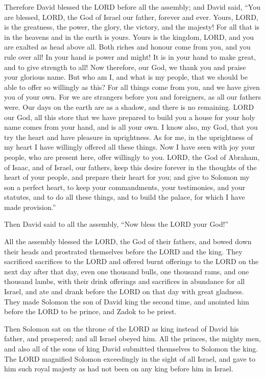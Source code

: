  Therefore David blessed the LORD before all the assembly;
and David said, ``You are blessed, LORD, the God of Israel our father,
forever and ever.  Yours, LORD, is the greatness, the
power, the glory, the victory, and the majesty! For all that is in the
heavens and in the earth is yours. Yours is the kingdom, LORD, and you
are exalted as head above all.  Both riches and honour come
from you, and you rule over all! In your hand is power and might! It is
in your hand to make great, and to give strength to all! 
Now therefore, our God, we thank you and praise your glorious name.
 But who am I, and what is my people, that we should be
able to offer so willingly as this? For all things come from you, and we
have given you of your own.  For we are strangers before
you and foreigners, as all our fathers were. Our days on the earth are
as a shadow, and there is no remaining.  LORD our God, all
this store that we have prepared to build you a house for your holy name
comes from your hand, and is all your own.  I know also, my
God, that you try the heart and have pleasure in uprightness. As for me,
in the uprightness of my heart I have willingly offered all these
things. Now I have seen with joy your people, who are present here,
offer willingly to you.  LORD, the God of Abraham, of
Isaac, and of Israel, our fathers, keep this desire forever in the
thoughts of the heart of your people, and prepare their heart for you;
 and give to Solomon my son a perfect heart, to keep your
commandments, your testimonies, and your statutes, and to do all these
things, and to build the palace, for which I have made provision.''

 Then David said to all the assembly, ``Now bless the LORD
your God!''

All the assembly blessed the LORD, the God of their fathers, and bowed
down their heads and prostrated themselves before the LORD and the king.
 They sacrificed sacrifices to the LORD and offered burnt
offerings to the LORD on the next day after that day, even one thousand
bulls, one thousand rams, and one thousand lambs, with their drink
offerings and sacrifices in abundance for all Israel,  and
ate and drank before the LORD on that day with great gladness. They made
Solomon the son of David king the second time, and anointed him before
the LORD to be prince, and Zadok to be priest.

 Then Solomon sat on the throne of the LORD as king instead
of David his father, and prospered; and all Israel obeyed him.
 All the princes, the mighty men, and also all of the sons
of king David submitted themselves to Solomon the king. 
The LORD magnified Solomon exceedingly in the sight of all Israel, and
gave to him such royal majesty as had not been on any king before him in
Israel.

